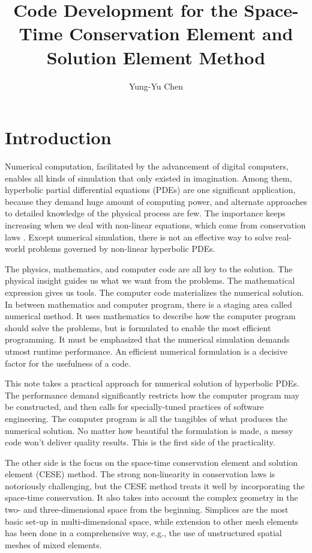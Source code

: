 \documentclass{turgon}
\title{
%
Code Development for the Space-Time Conservation Element and Solution Element
Method
%
}
\author{
%
Yung-Yu Chen
%
}
\begin{document}
\maketitle

\tableofcontents

\chapter*{Introduction}

Numerical computation, facilitated by the advancement of digital computers,
enables all kinds of simulation that only existed in imagination.  Among them,
hyperbolic partial differential equations (PDEs) are one significant
application, because they demand huge amount of computing power, and alternate
approaches to detailed knowledge of the physical process are few.  The
importance keeps increasing when we deal with non-linear equations, which come
from conservation laws \citep{lax_hyperbolic_1973}.  Except numerical
simulation, there is not an effective way to solve real-world problems governed
by non-linear hyperbolic PDEs.

The physics, mathematics, and computer code are all key to the solution.  The
physical insight guides us what we want from the problems.  The mathematical
expression gives us tools.  The computer code materializes the numerical
solution.  In between mathematics and computer program, there is a staging area
called numerical method.  It uses mathematics to describe how the computer
program should solve the problems, but is formulated to enable the most
efficient programming.  It must be emphasized that the numerical simulation
demands utmost runtime performance.  An efficient numerical formulation is a
decisive factor for the usefulness of a code.

This note takes a practical approach for numerical solution of hyperbolic PDEs.
The performance demand significantly restricts how the computer program may be
constructed, and then calls for specially-tuned practices of software
engineering.  The computer program is all the tangibles of what produces the
numerical solution.  No matter how beautiful the formulation is made, a messy
code won't deliver quality results.  This is the first side of the
practicality.

The other side is the focus on the space-time conservation element and solution
element (CESE) method.  The strong non-linearity in conservation laws is
notoriously challenging, but the CESE method treats it well by incorporating
the space-time conservation.  It also takes into account the complex geometry
in the two- and three-dimensional space from the beginning.  Simplices are the
most basic set-up in multi-dimensional space, while extension to other mesh
elements has been done in a comprehensive way, e.g., the use of unstructured
spatial meshes of mixed elements.
\end{document}
